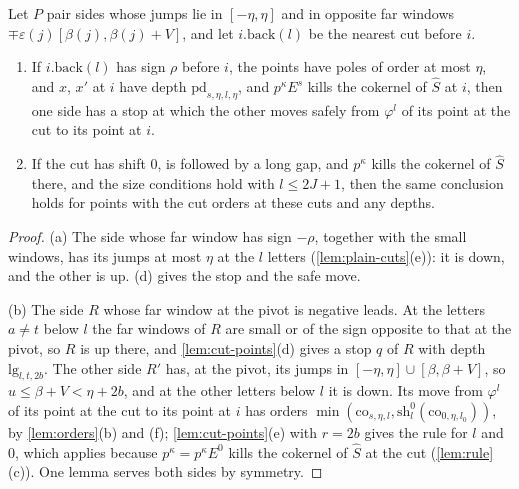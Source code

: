 \begin{lemma}\label{lem:stops}
Let $P$ pair sides whose jumps lie in $[-\eta,\eta]$ and in opposite far windows $\mp\varepsilon(j)[\beta(j),\beta(j)+V]$, and let $i.\mathrm{back}(l)$ be the nearest cut before $i$.
\begin{enumerate}[label=\textup{(\alph*)}]
\item If $i.\mathrm{back}(l)$ has sign $\rho$ before $i$, the points have poles of order at most $\eta$, and $x$, $x'$ at $i$ have depth $\mathrm{pd}_{s,\eta,l,\eta}$, and $p^\kappa E^s$ kills the cokernel of $\hat S$ at $i$, then one side has a stop at which the other moves safely from $\varphi^l$ of its point at the cut
to its point at $i$.
\item If the cut has shift $0$, is followed by a long gap, and $p^\kappa$ kills the cokernel of $\hat S$ there, and the size conditions hold with $l\le2J+1$, then the same conclusion holds for points with the cut orders at these cuts and any depths.
\end{enumerate}
\end{lemma}

\begin{proof}
(a) The side whose far window has sign $-\rho$, together with the small windows, has its jumps at most $\eta$ at the $l$ letters (\cref{lem:plain-cuts}(e)): it is down, and the other is up. (d) gives the stop and the safe move.

(b) The side $R$ whose far window at the pivot is negative leads. At the letters $a\ne t$ below $l$ the far windows of $R$ are small or of the sign opposite to that at the pivot, so $R$ is up there, and \cref{lem:cut-points}(d) gives a stop $q$ of $R$ with depth $\mathrm{lg}_{l,t,2b}$. The other side $R'$ has, at the pivot, its
jumps in $[-\eta,\eta]\cup[\beta,\beta+V]$, so $u\le\beta+V<\eta+2b$, and at the other letters below $l$ it is down. Its move from $\varphi^l$ of its point at the cut to its point at $i$ has orders $\min(\mathrm{co}_{s,\eta,l},\mathrm{sh}^0_l(\mathrm{co}_{0,\eta,l_0}))$, by \cref{lem:orders}(b) and (f); \cref{lem:cut-points}(e)
with $r=2b$ gives the rule for $l$ and $0$, which applies because $p^\kappa=p^\kappa E^0$ kills the cokernel of $\hat S$ at the cut (\cref{lem:rule}(c)). One lemma serves both sides by symmetry.
\end{proof}

